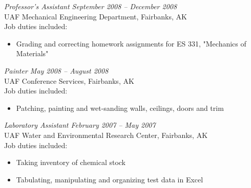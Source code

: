 \documentclass[10pt, letterpaper]{article}
\begin{document}
\large\textit{Professor's Assistant	\hfill September 2008 -- December 2008}\normalsize \\
UAF Mechanical Engineering Department, Fairbanks, AK\\
Job duties included:
\small\begin{itemize}
\item Grading and correcting homework assignments for ES 331, "Mechanics of Materials"
\end{itemize}\normalsize\medskip

\large\textit{Painter	\hfill May 2008 -- August 2008}\normalsize\\
UAF Conference Services, Fairbanks, AK\\
Job duties included:
\small\begin{itemize}
\item Patching, painting and wet-sanding walls, ceilings, doors and trim
\end{itemize}\normalsize\medskip

%
\large\textit{Laboratory Assistant \hfill February 2007 -- May 2007}\normalsize \\
UAF Water and Environmental Research Center, Fairbanks, AK\\
Job duties included:
\small\begin{itemize}
\item Taking inventory of chemical stock
\item Tabulating, manipulating and organizing test data in Excel
\end{itemize}\normalsize\medskip
%
\end{document}
